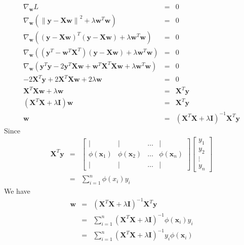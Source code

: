 \documentclass[12pt]{article}
\begin{document}
\begin{eqnarray*}
  \nabla_{\textbf{w}} {L} &=& 0 \\
  \nabla_{\textbf{w}} {\left( 
      \left\lVert \textbf{y} - \textbf{Xw} \right\rVert^2 
      + \lambda \textbf{w}^T \textbf{w} \right)} &=& 0 \\
  \nabla_{\textbf{w}} {\left( \left(\textbf{y} - \textbf{Xw} \right)^T
      \left(\textbf{y} - \textbf{Xw} \right) 
      + \lambda \textbf{w}^T \textbf{w} \right)} &=& 0 \\
  \nabla_{\textbf{w}} {\left( 
      \left(\textbf{y}^T - \textbf{w}^T \textbf{X}^T \right)
      \left(\textbf{y} - \textbf{Xw} \right) 
      + \lambda \textbf{w}^T \textbf{w} \right)} &=& 0 \\
  \nabla_{\textbf{w}} {\left( 
      \textbf{y}^T \textbf{y} - 2 \textbf{y}^T \textbf{X} \textbf{w}
      + \textbf{w}^T \textbf{X}^T \textbf{Xw} 
      + \lambda \textbf{w}^T \textbf{w} \right)} &=& 0 \\
  - 2 \textbf{X}^T \textbf{y} + 2 \textbf{X}^T \textbf{Xw} 
  + 2 \lambda \textbf{w} &=& 0 \\
  \textbf{X}^T \textbf{Xw} + \lambda \textbf{w}
  &=& \textbf{X}^T \textbf{y} \\
  \left( \textbf{X}^T \textbf{X} + \lambda \textbf{I} \right) \textbf{w}
  &=& \textbf{X}^T \textbf{y} \\
  \textbf{w} &=&
  \left( \textbf{X}^T \textbf{X} + \lambda \textbf{I} \right)^{-1}
  \textbf{X}^T \textbf{y}
\end{eqnarray*}
Since
\begin{eqnarray*}
  \textbf{X}^T \textbf{y} &=&
  \begin{bmatrix}
    | & | & \dots  & | \\
    \phi(\textbf{x}_1) & \phi(\textbf{x}_2) & \dots & \phi(\textbf{x}_n) \\
    | & | & \dots  & |
  \end{bmatrix}
  \begin{bmatrix}
    y_1 \\
    y_2 \\
    \vdots \\
    y_n
  \end{bmatrix} \\
  &=& \sum_{i=1}^n \phi(x_i) y_i
\end{eqnarray*}
We have
\begin{eqnarray*}
  \textbf{w}
  &=& \left( \textbf{X}^T \textbf{X} + \lambda \textbf{I} \right)^{-1}
  \textbf{X}^T \textbf{y} \\
  &=& \sum_{i=1}^n
  \left( \textbf{X}^T \textbf{X} + \lambda \textbf{I} \right)^{-1}
  \phi(\textbf{x}_i) y_i \\
  &=& \sum_{i=1}^n
  \left( \textbf{X}^T \textbf{X} + \lambda \textbf{I} \right)^{-1}
  y_i \phi(\textbf{x}_i) 
\end{eqnarray*}
\end{document}
